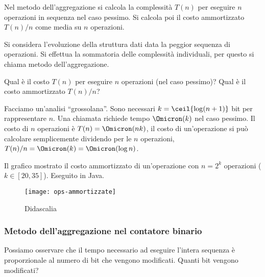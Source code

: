 Nel metodo dell'aggregazione si calcola la complessità \(T(n)\) per eseguire \(n\) operazioni in sequenza nel caso pessimo.
Si calcola poi il costo ammortizzato \(T(n)/n\) come media su \(n\) operazioni.

Si considera l'evoluzione della struttura dati data la peggior sequenza di operazioni.
Si effettua la sommatoria delle complessità individuali, per questo si chiama metodo dell'aggregazione.

Qual è il costo \(T(n)\) per eseguire \(n\) operazioni (nel caso pessimo)?
Qual è il costo ammortizzato \(T(n)/n\)?

Facciamo un'analisi \enquote{grossolana}.
Sono necessari \(k = \ceil{\log(n+1)}\) bit per rappresentare \(n\).
Una chiamata \increment{} richiede tempo \(\Omicron(k)\) nel caso pessimo.
Il costo di \(n\) operazioni è \(T(n) = \Omicron(nk)\), il costo di un'operazione si può calcolare semplicemente dividendo per le \(n\) operazioni, \(T(n)/n = \Omicron(k) = \Omicron(\log n)\).

Il grafico mostrato il costo ammortizzato di un'operazione con \(n = 2^k\) operazioni (\(k \in [20, 35]\)).
Eseguito in Java.

\begin{figure}[!ht]\centering
    \texttt{[image: ops-ammortizzate]}
    \caption{Didascalia}\label{fig:ops-ammortizzate}
\end{figure}

\subsubsection{Metodo dell'aggregazione nel contatore binario}

Possiamo osservare che il tempo necessario ad eseguire l'intera sequenza è proporzionale al numero di bit che vengono modificati.
Quanti bit vengono modificati?

\newcommand{\diff}[1]{\textcolor{red}{\textbf{#1}}}

